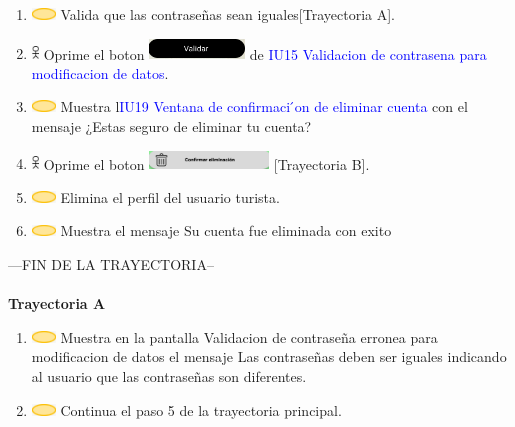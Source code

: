 \begin{enumerate}
        \item \includegraphics[width=0.0500\textwidth]{Figuras/sistema.png} Valida que las contraseñas sean iguales[Trayectoria A].
        \item \includegraphics[width=0.0150\textwidth]{Figuras/persona.png} Oprime el boton \includegraphics[width=0.2\textwidth]{ComponentesCU/img1.png} de \textcolor{blue}{IU15 Validacion de contrasena para modificacion de datos}.
        \item \includegraphics[width=0.0500\textwidth]{Figuras/sistema.png} Muestra l\textcolor{blue}{IU19 Ventana de confirmaci ́on de eliminar cuenta} con el mensaje ¿Estas seguro de eliminar tu cuenta?
        \item \includegraphics[width=0.0150\textwidth]{Figuras/persona.png} Oprime el boton \includegraphics[width=0.25\textwidth]{ComponentesCU/img2.png} [Trayectoria B].
        \item \includegraphics[width=0.0500\textwidth]{Figuras/sistema.png} Elimina el perfil del usuario turista.
        \item \includegraphics[width=0.0500\textwidth]{Figuras/sistema.png} Muestra el mensaje Su cuenta fue eliminada con exito
    \end{enumerate}
---FIN DE LA TRAYECTORIA--\\\\
\textbf{Trayectoria A}
    \begin{enumerate}
        \item \includegraphics[width=0.0500\textwidth]{Figuras/sistema.png} Muestra en la pantalla Validacion de contraseña erronea para modificacion de datos el mensaje Las contraseñas deben ser iguales indicando al usuario que las contraseñas son diferentes.
        \item \includegraphics[width=0.0500\textwidth]{Figuras/sistema.png} Continua el paso 5 de la trayectoria principal.
    \end{enumerate}
